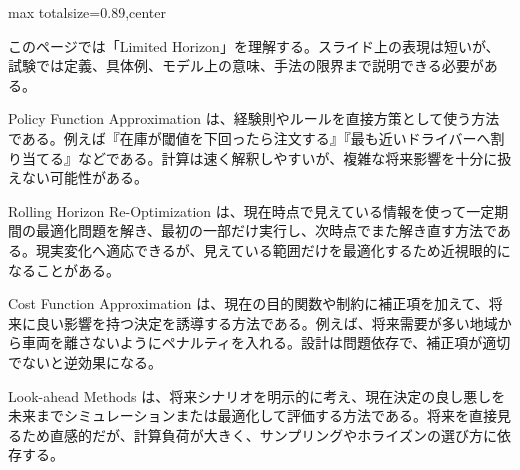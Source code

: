 \begin{minipage}[t]{0.58\textwidth}
\begin{adjustbox}{max totalsize={\textwidth}{0.89\textheight},center}
\begin{minipage}{\textwidth}\scriptsize
{}このページでは「Limited Horizon」を理解する。スライド上の表現は短いが、試験では定義、具体例、モデル上の意味、手法の限界まで説明できる必要がある。\par
Policy Function Approximation は、経験則やルールを直接方策として使う方法である。例えば『在庫が閾値を下回ったら注文する』『最も近いドライバーへ割り当てる』などである。計算は速く解釈しやすいが、複雑な将来影響を十分に扱えない可能性がある。\par
Rolling Horizon Re-Optimization は、現在時点で見えている情報を使って一定期間の最適化問題を解き、最初の一部だけ実行し、次時点でまた解き直す方法である。現実変化へ適応できるが、見えている範囲だけを最適化するため近視眼的になることがある。\par
Cost Function Approximation は、現在の目的関数や制約に補正項を加えて、将来に良い影響を持つ決定を誘導する方法である。例えば、将来需要が多い地域から車両を離さないようにペナルティを入れる。設計は問題依存で、補正項が適切でないと逆効果になる。\par
Look-ahead Methods は、将来シナリオを明示的に考え、現在決定の良し悪しを未来までシミュレーションまたは最適化して評価する方法である。将来を直接見るため直感的だが、計算負荷が大きく、サンプリングやホライズンの選び方に依存する。\par

\end{minipage}
\end{adjustbox}
\end{minipage}
